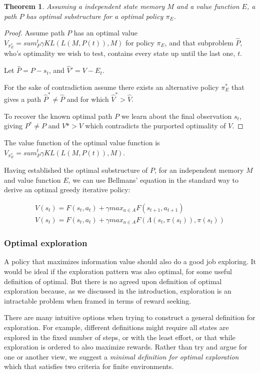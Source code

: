 \documentclass[9pt,twocolumn,twoside]{pnas-new}
\newtheorem{theorem}{Theorem}
\begin{document}
\begin{theorem}
    Assuming a independent state memory $M$ and a value function $E$, a path $P$ has optimal substructure for a optimal policy $\pi_E$.
\end{theorem}
\begin{proof}
    Assume path $P$ has an optimal value $V_{\pi_E^*} = sum^t_P \gamma KL(L(M, P(t)), M)$ for policy $\pi_E$, and that subproblem $\hat P$, who's optimality we wish to test, contains every state up until the last one, $t$. 
    
    Let $\hat P = P - s_t$, and $\hat V' = V - E_t$.

    For the sake of contradiction assume there exists an alternative policy $\pi_E^*$ that gives a path $\hat P^* \neq \hat P$ and for which $\hat V^* > \hat V$. 

    To recover the known optimal path $P$ we learn about the final observation $s_t$, giving $P^* \neq P$ and $V* > V$ which contradicts the purported optimality of $V$.
\end{proof}

The value function of the optimal value function is $V_{\pi_E^*} = sum^t_P \gamma KL(L(M, P(t)), M)$. 

Having established the optimal substructure of $P$, for an independent memory $M$ and value function $E$, we can use Bellmans' equation in the standard way to derive an optimal greedy iterative policy:

\begin{align}
    V(s_t) = F(s_t, a_t) + \gamma max_{a \in A} F(s_{t+1}, a_{t+1}) \\
    V(s_t) = F(s_t, a_t) + \gamma max_{a \in A} F(\Lambda(s_t, \pi(s_t)), \pi(s_t))
\end{align}


\subsubsection*{Optimal exploration}
A policy that maximizes information value should also do a good job exploring. It would be ideal if the exploration pattern was also optimal, for some useful definition of optimal. But there is no agreed upon definition of optimal exploration because, as we discussed in the introduction, exploration is an intractable problem when framed in terms of reward seeking. 

There are many intuitive options when trying to construct a general definition for exploration. For example, different definitions might require all states are explored in the fixed number of steps, or with the least effort, or that while exploration is ordered to also maximize rewards. Rather than try and argue for one or another view, we suggest a \textit{minimal definition for optimal exploration} which that satisfies two criteria for finite environments. 
\end{document}
